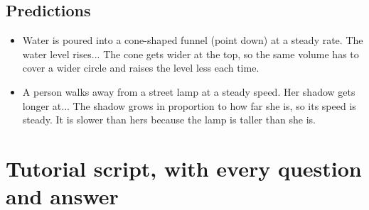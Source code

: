 \documentclass[11pt]{article}
\begin{document}
\subsection*{Predictions}\begin{itemize}
\item Water is poured into a cone-shaped funnel (point down) at a steady rate. The water level rises...  The cone gets wider at the top, so the same volume has to cover a wider circle and raises the level less each time.
\item A person walks away from a street lamp at a steady speed. Her shadow gets longer at...  The shadow grows in proportion to how far she is, so its speed is steady. It is slower than hers because the lamp is taller than she is.
\end{itemize}
\section*{Tutorial script, with every question and answer}
\end{document}
